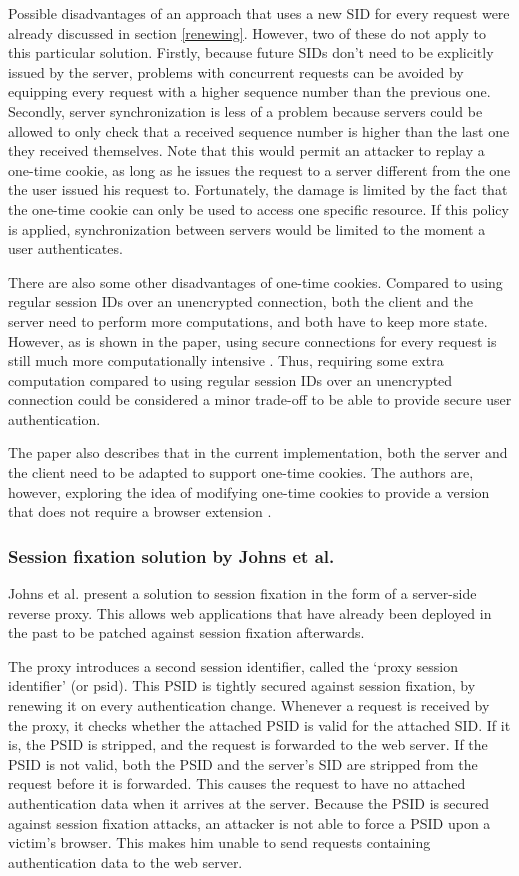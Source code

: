 Possible disadvantages of an approach that uses a new SID for every request were already discussed in section \ref{renewing}. However, two of these do not apply to this particular solution. Firstly, because future SIDs don't need to be explicitly issued by the server, problems with concurrent requests can be avoided by equipping every request with a higher sequence number than the previous one. Secondly, server synchronization is less of a problem because servers could be allowed to only check that a received sequence number is higher than the last one they received themselves. Note that this would permit an attacker to replay a one-time cookie, as long as he issues the request to a server different from the one the user issued his request to. Fortunately, the damage is limited by the fact that the one-time cookie can only be used to access one specific resource. If this policy is applied, synchronization between servers would be limited to the moment a user authenticates.

There are also some other disadvantages of one-time cookies. Compared to using regular session IDs over an unencrypted connection, both the client and the server need to perform more computations, and both have to keep more state. However, as is shown in the paper, using secure connections for every request is still much more computationally intensive \cite{Dacosta2011}. Thus, requiring some extra computation compared to using regular session IDs over an unencrypted connection could be considered a minor trade-off to be able to provide secure user authentication.

The paper also describes that in the current implementation, both the server and the client need to be adapted to support one-time cookies. The authors are, however, exploring the idea of modifying one-time cookies to provide a version that does not require a browser extension \cite{Dacosta2011}.

\subsubsection{Session fixation solution by Johns et al.}%

Johns et al. \cite{Johns2011} present a solution to session fixation in the form of a server-side reverse proxy. This allows web applications that have already been deployed in the past to be patched against session fixation afterwards.

The proxy introduces a second session identifier, called the `proxy session identifier' (or \gls{psid}). This PSID is tightly secured against session fixation, by renewing it on every authentication change. Whenever a request is received by the proxy, it checks whether the attached PSID is valid for the attached SID. If it is, the PSID is stripped, and the request is forwarded to the web server. If the PSID is not valid, both the PSID and the server's SID are stripped from the request before it is forwarded. This causes the request to have no attached authentication data when it arrives at the server. Because the PSID is secured against session fixation attacks, an attacker is not able to force a PSID upon a victim's browser. This makes him unable to send requests containing authentication data to the web server.

